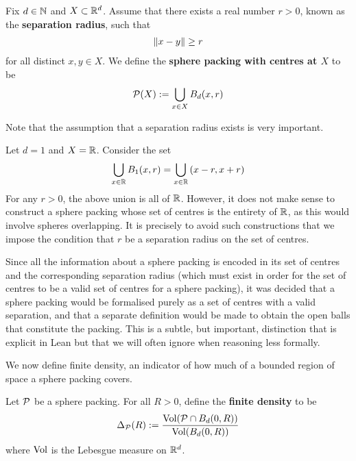 \begin{boxdefinition}
    Fix $d \in \mathbb{N}$ and $X \subset \mathbb{R}^d$. Assume that there exists a real number $r > 0$, known as the \textbf{separation radius}, such that
    \begin{align*}
        \left\lVert x - y \right\rVert \geq r
    \end{align*}
    for all distinct $x, y \in X$. We define the \textbf{sphere packing with centres at $X$} to be
    \begin{align*}
        \mathcal{P}(X) := \bigcup_{x \in X} B_d(x, r)
    \end{align*}
\end{boxdefinition}

Note that the assumption that a separation radius exists is very important.

\begin{boxnexample}
    Let $d = 1$ and $X = \mathbb{R}$. Consider the set
    \begin{align*}
        \bigcup_{x \in \mathbb{R}} B_1(x, r) = \bigcup_{x \in \mathbb{R}} \left( x-r, x+r \right)
    \end{align*}
    For any $r > 0$, the above union is all of $\mathbb{R}$. However, it does not make sense to construct a sphere packing whose set of centres is the entirety of $\mathbb{R}$, as this would involve spheres overlapping. It is precisely to avoid such constructions that we impose the condition that $r$ be a separation radius on the set of centres.
\end{boxnexample}

Since all the information about a sphere packing is encoded in its set of centres and the corresponding separation radius (which must exist in order for the set of centres to be a valid set of centres for a sphere packing), it was decided that a sphere packing would be formalised purely as a set of centres with a valid separation, and that a separate definition would be made to obtain the open balls that constitute the packing. This is a subtle, but important, distinction that is explicit in Lean but that we will often ignore when reasoning less formally.

We now define finite density, an indicator of how much of a bounded region of space a sphere packing covers.

\begin{boxdefinition}\label{Ch2:Def:FiniteDensity}
    Let $\mathcal{P}$ be a sphere packing. For all $R > 0$, define the \textbf{finite density} to be
    \begin{align*}
        \Delta_{\mathcal{P}}(R) := \frac{\operatorname{Vol}\!\left( \mathcal{P} \cap B_d(0, R) \right)}{\operatorname{Vol}\!\left( B_d(0, R) \right)}
    \end{align*}
    where $\operatorname{Vol}$ is the Lebesgue measure on $\mathbb{R}^d$.
\end{boxdefinition}


